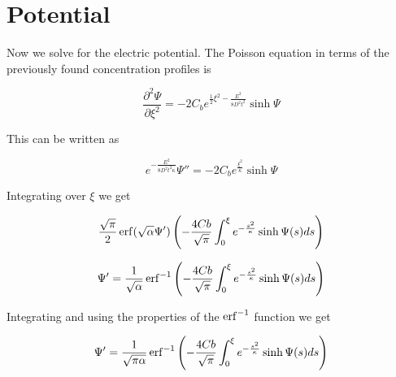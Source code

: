 \section{Potential}

Now we solve for the electric potential. The Poisson equation in terms of the previously found concentration profiles is

\begin{equation}
	\frac{\partial^2 \Psi}{\partial \xi^2} = -2C_be^{\frac{1}{2}{\xi^2-\frac{E^2}{8D^2t^2}}}\sinh{\Psi}
\end{equation}

This can be written as

\begin{equation}
	e^{-\frac{E^2}{8D^2t^2\kappa}}\Psi'' = -2C_b e^{\frac{\xi^2}{\kappa}}\sinh{\Psi}
\end{equation}

Integrating over $\xi$ we get

\begin{equation}
	\frac{\sqrt{\pi}}{2}\operatorname{erf}(\sqrt{\alpha}\Psi')\left({-\frac{4Cb}{\sqrt{\pi}}\int_0^\xi e^{-\frac{s^2}{\kappa}}\sinh{\Psi(s)}ds}\right)
\end{equation}


\begin{equation}
	\Psi'= \frac{1}{\sqrt{\alpha}}\operatorname{erf}^{-1}\left({-\frac{4Cb}{\sqrt{\pi}}\int_0^\xi e^{-\frac{s^2}{\kappa}}\sinh{\Psi(s)}ds}\right)
\end{equation}

Integrating and using the properties of the $\operatorname{erf}^{-1}$ function we get

\begin{equation}
	\Psi'= \frac{1}{\sqrt{\pi\alpha}}\operatorname{erf}^{-1}\left({-\frac{4Cb}{\sqrt{\pi}}\int_0^\xi e^{-\frac{s^2}{\kappa}}\sinh{\Psi(s)}ds}\right)
\end{equation}












